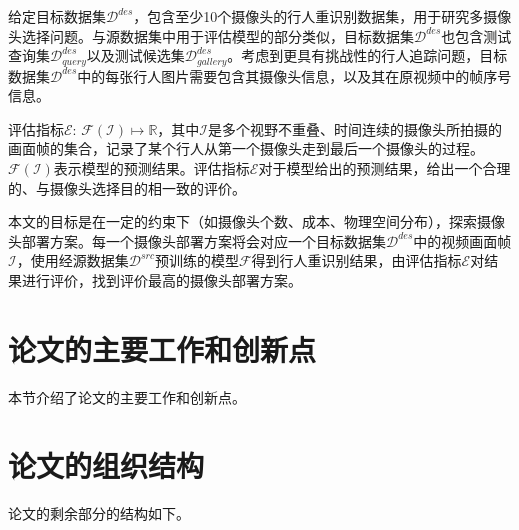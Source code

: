 给定目标数据集$\mathcal{D}^{des}$，包含至少10个摄像头的行人重识别数据集，用于研究多摄像头选择问题。与源数据集中用于评估模型的部分类似，目标数据集$\mathcal{D}^{des}$也包含测试查询集$\mathcal{D}_{query}^{des}$以及测试候选集$\mathcal{D}_{gallery}^{des}$。考虑到更具有挑战性的行人追踪问题，目标数据集$\mathcal{D}^{des}$中的每张行人图片需要包含其摄像头信息，以及其在原视频中的帧序号信息。

评估指标$\mathcal{E}:\,\mathcal{F}(\mathcal{I})\mapsto\mathbb{R}$，其中$\mathcal{I}$是多个视野不重叠、时间连续的摄像头所拍摄的画面帧的集合，记录了某个行人从第一个摄像头走到最后一个摄像头的过程。$\mathcal{F}(\mathcal{I})$表示模型的预测结果。评估指标$\mathcal{E}$对于模型给出的预测结果，给出一个合理的、与摄像头选择目的相一致的评价。

本文的目标是在一定的约束下（如摄像头个数、成本、物理空间分布），探索摄像头部署方案。每一个摄像头部署方案将会对应一个目标数据集$\mathcal{D}^{des}$中的视频画面帧$\mathcal{I}$，使用经源数据集$\mathcal{D}^{src}$预训练的模型$\mathcal{F}$得到行人重识别结果，由评估指标$\mathcal{E}$对结果进行评价，找到评价最高的摄像头部署方案。

\section{论文的主要工作和创新点}

本节介绍了论文的主要工作和创新点。

\section{论文的组织结构}
论文的剩余部分的结构如下。